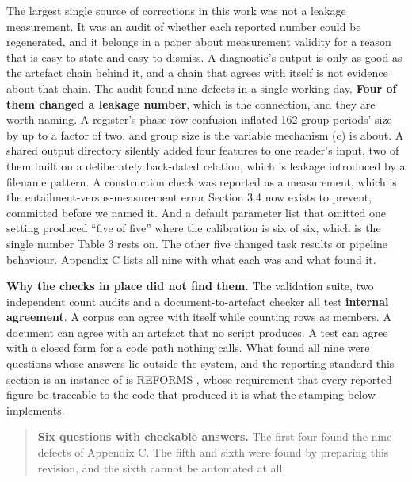 \documentclass[twoside,11pt]{article}
\begin{document}
The largest single source of corrections in this work was not a leakage measurement. It was an audit of whether each reported number could be regenerated, and it belongs in a paper about measurement validity for a reason that is easy to state and easy to dismiss. A diagnostic's output is only as good as the artefact chain behind it, and a chain that agrees with itself is not evidence about that chain. The audit found nine defects in a single working day. \textbf{Four of them changed a leakage number}, which is the connection, and they are worth naming. A register's phase-row confusion inflated 162 group periods' size by up to a factor of two, and group size is the variable mechanism (c) is about. A shared output directory silently added four features to one reader's input, two of them built on a deliberately back-dated relation, which is leakage introduced by a filename pattern. A construction check was reported as a measurement, which is the entailment-versus-measurement error Section 3.4 now exists to prevent, committed before we named it. And a default parameter list that omitted one setting produced ``five of five'' where the calibration is six of six, which is the single number Table 3 rests on. The other five changed task results or pipeline behaviour. Appendix C lists all nine with what each was and what found it.

\textbf{Why the checks in place did not find them.} The validation suite, two independent count audits and a document-to-artefact checker all test \textbf{internal agreement}. A corpus can agree with itself while counting rows as members. A document can agree with an artefact that no script produces. A test can agree with a closed form for a code path nothing calls. What found all nine were questions whose answers lie outside the system, and the reporting standard this section is an instance of is REFORMS \citep{reforms}, whose requirement that every reported figure be traceable to the code that produced it is what the stamping below implements.

\begin{quote}
\textbf{Six questions with checkable answers.} The first four found the nine defects of Appendix C. The fifth and sixth were found by preparing this revision, and the sixth cannot be automated at all.
\end{quote}
\end{document}
